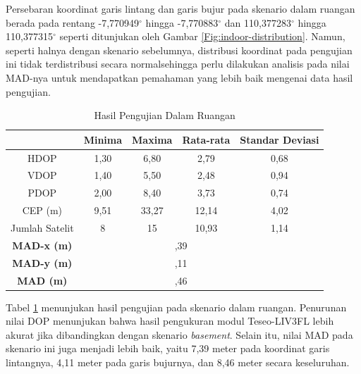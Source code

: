 Persebaran koordinat garis lintang dan garis bujur pada skenario dalam ruangan berada pada rentang -7,770949$^{\circ}$ hingga -7,770883$^{\circ}$ dan 110,377283$^{\circ}$ hingga 110,377315$^{\circ}$ seperti ditunjukan oleh Gambar \ref{Fig:indoor-distribution}. Namun, seperti halnya dengan skenario sebelumnya, distribusi koordinat pada pengujian ini tidak terdistribusi secara normalsehingga perlu dilakukan analisis pada nilai MAD-nya untuk mendapatkan pemahaman yang lebih baik mengenai data hasil pengujian.

\begin{table}[H]
	\caption{Hasil Pengujian Dalam Ruangan}
	\vspace{0.5em}
	\centering
	\begin{tabular}{ccccc}
		\hline
		& \textbf{Minima} & \textbf{Maxima} & \textbf{Rata-rata} & \textbf{Standar Deviasi}\\
		\hline 
		HDOP & 1,30 & 6,80 & 2,79 & 0,68\\
		VDOP & 1,40 & 5,50 & 2,48 & 0,94\\
		PDOP & 2,00 & 8,40 & 3,73 & 0,74\\
		CEP (m) & 9,51	& 33,27 & 12,14 & 4,02\\
		Jumlah Satelit & 8 & 15 & 10,93 & 1,14\\
		\hline
		\textbf{MAD-x (m)} & & \multicolumn{2}{c}{\centering 7,39} & \\
		\hline
		\textbf{MAD-y (m)} & & \multicolumn{2}{c}{\centering 4,11} & \\
		\hline
		\textbf{MAD (m)} & & \multicolumn{2}{c}{\centering 8,46} & \\
		\hline
	\end{tabular}
	\label{Tab: indoor-table}
\end{table}

Tabel \ref{Tab: indoor-table} menunjukan hasil pengujian pada skenario dalam ruangan. Penurunan nilai DOP menunjukan bahwa hasil pengukuran modul Teseo-LIV3FL lebih akurat jika dibandingkan dengan skenario \textit{basement}. Selain itu, nilai MAD pada skenario ini juga menjadi lebih baik, yaitu 7,39 meter pada koordinat garis lintangnya, 4,11 meter pada garis bujurnya, dan 8,46 meter secara keseluruhan.

